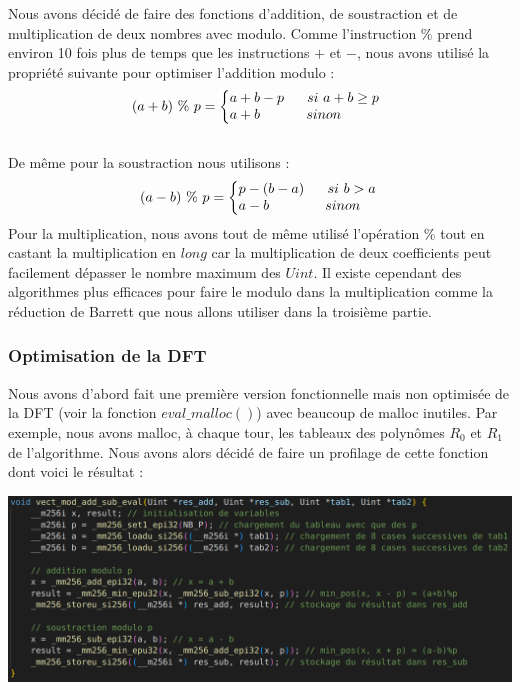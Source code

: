 \documentclass[12pt, a4paper]{article}
\begin{document}
Nous avons décidé de faire des fonctions d'addition, de soustraction et de multiplication de deux nombres avec modulo. Comme l'instruction $\%$ prend environ 10 fois plus de temps que les instructions $+$ et $-$, nous avons utilisé la propriété suivante pour optimiser l'addition modulo : \\
\[ (a+b)\ \%\ p = 
\left\{\begin{array}{@{}l@{}}
a + b - p\ \ \ \ \ si\ a+b \geq p\\
a + b\ \ \ \ \ \ \ \ \ \ sinon
\end{array}\right.\,\ \] \\
De même pour la soustraction nous utilisons :
\[ (a-b)\ \%\ p = 
\left\{\begin{array}{@{}l@{}}
p - (b - a)\ \ \ \ \ si\ b > a\\
a - b\ \ \ \ \ \ \ \ \ \ \ \ sinon
\end{array}\right.\,\]
Pour la multiplication, nous avons tout de même utilisé l'opération $\%$ tout en castant la multiplication en $long$ car la multiplication de deux coefficients peut facilement dépasser le nombre maximum des $Uint$. Il existe cependant des algorithmes plus efficaces pour faire le modulo dans la multiplication comme la réduction de Barrett que nous allons utiliser dans la troisième partie.

\subsubsection{Optimisation de la DFT}
Nous avons d'abord fait une première version fonctionnelle mais non optimisée de la DFT (voir la fonction $eval\_malloc()$) avec beaucoup de malloc inutiles. Par exemple, nous avons malloc, à chaque tour, les tableaux des polynômes $R_0$ et $R_1$ de l'algorithme. Nous avons alors décidé de faire un profilage de cette fonction dont voici le résultat : \\
\centerline{\includegraphics[scale=0.7]{profiler_eval_malloc}}
\end{document}
